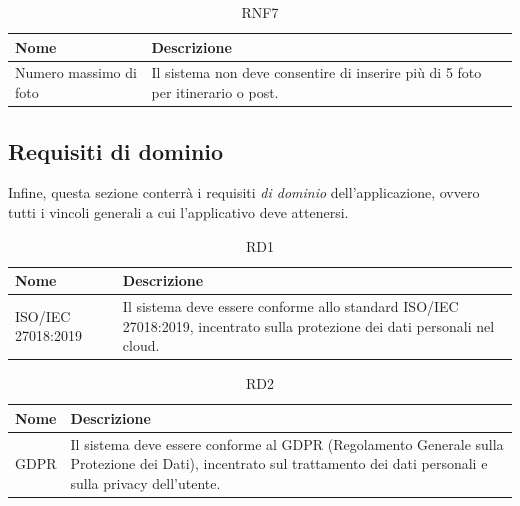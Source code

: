 \documentclass{natourDoc}
\begin{document}
\begin{table}[H]
	\centering
	\begin{tabular}{ |p{5cm}|p{10.3cm}| }
		\hline
		\rowcolor{PineGreen!70}
		\textbf{Nome}          & \textbf{Descrizione}                                                     \\
		\hline
		Numero massimo di foto & Il sistema non deve consentire di inserire più di 5 foto per itinerario o post. \\
		\hline
	\end{tabular}
	\caption{RNF7}
\end{table}

\newpage
\subsection{Requisiti di dominio}
Infine, questa sezione conterrà i requisiti \textit{di dominio} dell'applicazione, ovvero tutti i vincoli generali a cui l'applicativo
deve attenersi. \\

\begin{table}[H]
	\centering
	\begin{tabular}{ |p{5cm}|p{10.3cm}| }
		\hline
		\rowcolor{PineGreen!70}
		\textbf{Nome}      & \textbf{Descrizione}                                              \\
		\hline
		ISO/IEC 27018:2019 & Il sistema deve essere conforme allo standard ISO/IEC 27018:2019,
		incentrato sulla protezione dei dati personali nel cloud.                              \\
		\hline
	\end{tabular}
	\caption{RD1}

\end{table}

\begin{table}[H]
	\centering
	\begin{tabular}{ |p{5cm}|p{10.3cm}| }
		\hline
		\rowcolor{PineGreen!70}
		\textbf{Nome} & \textbf{Descrizione}                                                                      \\
		\hline
		GDPR          & Il sistema deve essere conforme al GDPR (Regolamento Generale sulla Protezione dei Dati),
		incentrato sul trattamento dei dati personali e sulla privacy dell’utente.                                \\
		\hline
	\end{tabular}
	\caption{RD2}

\end{table}
\end{document}
